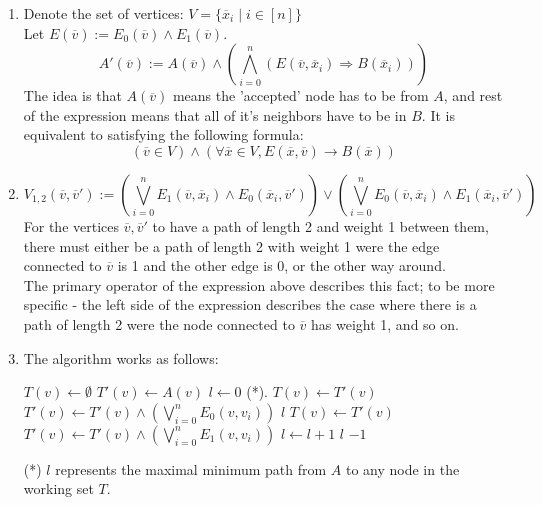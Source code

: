 \documentclass{article}
\newcommand{\lv}[0]{\overline{v}}
\newcommand{\lx}[0]{\overline{x}}
\begin{document}
\begin{enumerate}[label=\textbf{\alph*.}]
    \item 
        Denote the set of vertices: $V=\{\lx_i\mid i\in[n]\}$\\
        Let $E(\lv):=E_0(\lv)\wedge E_1(\lv)$.
        \[
            A'(\lv):=A(\lv)\wedge \left(\bigwedge_{i=0}^n(E(\lv,\lx_i)\Rightarrow B(\lx_i))\right)
        \]
        The idea is that $A(\lv)$ means the 'accepted' node has to be from $A$,
        and rest of the expression means that all of it's neighbors have to be in $B$.
        It is equivalent to satisfying the following formula:
        \[
            (\lv\in V)\wedge \left(\forall \lx\in V, E(\lx, \lv)\rightarrow B(\lx)\right)
        \]
    \item 
        \[
            V_{1,2}(\lv,\lv'):=
                \left(\bigvee_{i=0}^nE_1(\lv, \lx_i)\wedge E_0(\lx_i, \lv')\right)
                \vee
                \left(\bigvee_{i=0}^nE_0(\lv, \lx_i)\wedge E_1(\lx_i, \lv')\right)
        \]
        For the vertices $\lv,\lv'$ to have a 
        path of length 2 and weight 1 between them,
        there must either be a path of length 2 with weight
        1 were the edge connected to $\lv$ is 1 and the other edge is 0,
        or the other way around.\\
        The primary operator of the expression above describes this fact;
        to be more specific - the left side of the expression
        describes the case where there is a path of length 2 
        were the node connected to $\lv$ has weight 1, and so on.
    \item The algorithm works as follows:
    \begin{algorithmic}
        \State $T(v)\leftarrow\emptyset$
        \State $T'(v)\leftarrow A(v)$
        \State $l\leftarrow 0$ (*).
                \State $T(v)\leftarrow T'(v)$
                \State $T'(v)\leftarrow T'(v)\wedge\left(\bigvee_{i=0}^nE_0(v,v_i)\right)$
                    \State \Return $l$
                \EndIf
            \EndWhile
            \State $T(v)\leftarrow T'(v)$
            \State $T'(v)\leftarrow T'(v)\wedge\left(\bigvee_{i=0}^nE_1(v,v_i)\right)$
            \State $l\leftarrow l+1$
                \State \Return $l$
            \EndIf
        \EndWhile
        \State \Return $-1$
    \end{algorithmic}
    (*) $l$ represents the maximal minimum path from $A$ to any node in the working set $T$.\\


\end{enumerate}
\end{document}
